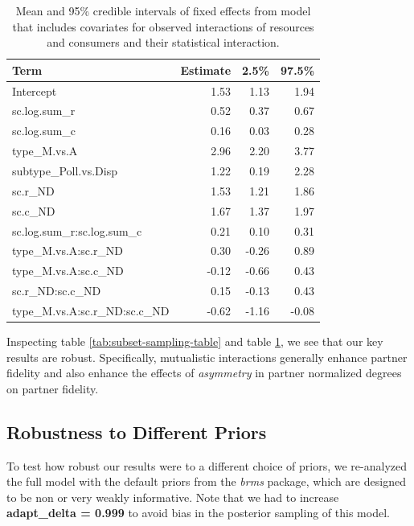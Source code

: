 \documentclass[11pt,]{article}
\begin{document}
\begin{table}[!h]

\caption{\label{tab:subset-sampling-v2-table}Mean and 95\% credible intervals of fixed effects from model that includes covariates for observed interactions of resources and consumers and their statistical interaction.}
\centering
\begin{tabular}{lrrr}
\toprule
Term & Estimate & 2.5\% & 97.5\%\\
\midrule
\rowcolor{gray!6}  Intercept & 1.53 & 1.13 & 1.94\\
sc.log.sum\_r & 0.52 & 0.37 & 0.67\\
\rowcolor{gray!6}  sc.log.sum\_c & 0.16 & 0.03 & 0.28\\
type\_M.vs.A & 2.96 & 2.20 & 3.77\\
\rowcolor{gray!6}  subtype\_Poll.vs.Disp & 1.22 & 0.19 & 2.28\\
sc.r\_ND & 1.53 & 1.21 & 1.86\\
\rowcolor{gray!6}  sc.c\_ND & 1.67 & 1.37 & 1.97\\
sc.log.sum\_r:sc.log.sum\_c & 0.21 & 0.10 & 0.31\\
\rowcolor{gray!6}  type\_M.vs.A:sc.r\_ND & 0.30 & -0.26 & 0.89\\
type\_M.vs.A:sc.c\_ND & -0.12 & -0.66 & 0.43\\
\rowcolor{gray!6}  sc.r\_ND:sc.c\_ND & 0.15 & -0.13 & 0.43\\
type\_M.vs.A:sc.r\_ND:sc.c\_ND & -0.62 & -1.16 & -0.08\\
\bottomrule
\end{tabular}
\end{table}

Inspecting table \ref{tab:subset-sampling-table} and table
\ref{tab:subset-sampling-v2-table}, we see that our key results are
robust. Specifically, mutualistic interactions generally enhance partner
fidelity and also enhance the effects of \emph{asymmetry} in partner
normalized degrees on partner fidelity.

\subsection{Robustness to Different
Priors}\label{robustness-to-different-priors}

To test how robust our results were to a different choice of priors, we
re-analyzed the full model with the default priors from the \emph{brms}
package, which are designed to be non or very weakly informative. Note
that we had to increase \textbf{adapt\_delta = 0.999} to avoid bias in
the posterior sampling of this model.
\end{document}
